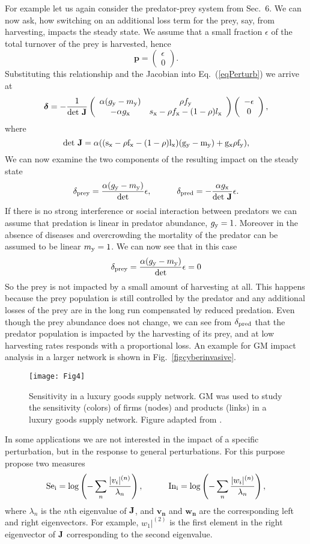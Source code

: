 \documentclass{article}
\newcommand{\eq}[1]{\begin{equation}#1\end{equation}}
\newcommand{\avec}[1]{\left( \begin{array}{c}#1\end{array} \right)}
\newcommand{\avecc}[1]{\left( \begin{array}{c c}#1\end{array} \right)}
\newcommand{\mat}[1]{\mathbf{#1}}
\renewcommand{\vec}[1]{\boldsymbol{#1}}
\begin{document}
For example let us again consider the predator-prey system from Sec.~6. We can now ask, how switching on an additional loss term for the prey, say, from harvesting, impacts the steady state. We assume that a small fraction $\epsilon$ of the total turnover of the prey is harvested, hence
\eq{
\vec{p} = \avec{\epsilon \\ 0}.
}
Substituting this relationship and the Jacobian into Eq.~(\ref{eqPerturb}) we arrive at 
\eq{
\vec{\delta}
= -\frac{1}{\rm{det} \ \mat{J}} 
\avecc{ \alpha (g_{\rm y}-m_{\rm y}) & \rho f_{\rm y} \\ -\alpha g_{\rm x} &  s_{\rm x}-\rho f_{\rm x} - (1-\rho) l_{\rm x}}
\avecc{-\epsilon\\ 0},
}
where
\eq{
\rm{det}\ \mat{J} = \alpha((s_{\rm x}-\rho f_{\rm x}-(1-\rho) l_{\rm x}) (g_{\rm y}-m_{\rm y}) + g_{\rm x} \rho f_{\rm y}),
}
We can now examine the two components of the resulting impact on the steady state
\eq{
\delta_{\rm prey} 
= \frac{ \alpha(g_{\rm y} - m_{\rm y})}{\rm{det}} \epsilon , \quad\quad\quad
\delta_{\rm pred} 
= -\frac{ \alpha g_{\rm x}} {\rm{det}\ \mat{J}} \epsilon .
}
If there is no strong interference or social interaction between predators we can assume that predation is linear in predator abundance, $g_{\rm y} = 1$. Moreover in the absence of diseases and overcrowding the mortality of the predator can be assumed to be linear $m_{\rm y} = 1$. We can now see that in this case 
\eq{
\delta_{\rm prey} = \frac{ \alpha(g_{\rm y} - m_{\rm y})}{\rm{det}} \epsilon = 0
}
So the prey is not impacted by a small amount of harvesting at all. This happens because the prey population is still controlled by the predator and any additional losses of the prey are in the long run compensated by reduced predation. Even though the prey abundance does not change, we can see from $\delta_{\rm pred}$ that the predator population is impacted by the harvesting of its prey, and at low harvesting rates responds with a proportional loss. An example for GM impact analysis in a larger network is shown in Fig.~\ref{figcyberinvasive}.

\begin{figure}
    \centering
    \texttt{[image: Fig4]}
    \caption{Sensitivity in a luxury goods supply network. GM was used to study the sensitivity (colors) of firms (nodes) and products (links) in a luxury goods supply network. Figure adapted from \cite{demirel2019identifying}.}
    \label{figsupply}
\end{figure}

In some applications we are not interested in the impact of a specific perturbation, but in the response to general perturbations. For this purpose \citet{Aufderheide2013PNAS} propose two measures
\eq{
{\rm{Se}_i} = {\rm {log}} \left(- \sum_{n} \frac{|v_{ i}|^{(n)}}{\lambda _{n}} \right), \quad\quad\quad
{\rm{In}_i} = {\rm {log}} \left(- \sum_{n} \frac{|w _{i}|^{(n)}}{\lambda _{n}}\right),
}
where $\lambda_n$ is the $n$th eigenvalue of $\bf J$, and $\vec{v_n}$ and $\vec{w_n}$ are the corresponding left and right eigenvectors. For example, $w_{1}|^{(2)}$ is the first element in the right eigenvector of $\bf J$ corresponding to the second eigenvalue.   
\end{document}
